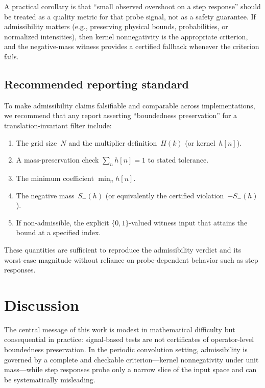 \documentclass[11pt,a4paper]{article}
\theoremstyle{plain}
\theoremstyle{definition}
\theoremstyle{plain}
\newcommand{\Sminus}{S_{-}}
\begin{document}
A practical corollary is that ``small observed overshoot on a step response''
should be treated as a quality metric for that probe signal, not as a safety
guarantee.  If admissibility matters (e.g., preserving physical bounds,
probabilities, or normalized intensities), then kernel nonnegativity is the
appropriate criterion, and the negative-mass witness provides a certified
fallback whenever the criterion fails.


\subsection{Recommended reporting standard}
\label{sec:reporting}

To make admissibility claims falsifiable and comparable across implementations,
we recommend that any report asserting ``boundedness preservation'' for a
translation-invariant filter include:

\begin{enumerate}[label=\arabic*.,leftmargin=2em]
  \item The grid size~$N$ and the multiplier definition~$H(k)$ (or
    kernel~$h[n]$).
  \item A mass-preservation check $\sum_n h[n] = 1$ to stated tolerance.
  \item The minimum coefficient $\min_n h[n]$.
  \item The negative mass~$\Sminus(h)$ (or equivalently the certified
    violation~$-\Sminus(h)$).
  \item If non-admissible, the explicit $\{0,1\}$-valued witness input that
    attains the bound at a specified index.
\end{enumerate}

These quantities are sufficient to reproduce the admissibility verdict and its
worst-case magnitude without reliance on probe-dependent behavior such as step
responses.


\section{Discussion}
\label{sec:discussion}

The central message of this work is modest in mathematical difficulty but
consequential in practice: signal-based tests are not certificates of
operator-level boundedness preservation.  In the periodic convolution setting,
admissibility is governed by a complete and checkable criterion---kernel
nonnegativity under unit mass---while step responses probe only a narrow slice of
the input space and can be systematically misleading.
\end{document}
